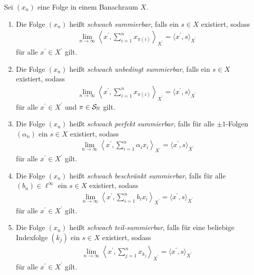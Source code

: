 \begin{df}
	Sei $ (x_n) $ eine Folge in einem Banachraum $ X $. 
	\begin{enumerate}
		\item 
		Die Folge $ (x_n) $ heißt  \textit{schwach summierbar}, falls ein $ s  \in X$ existiert, sodass
		\begin{align*}
			\lim\limits_{n \to \infty}
			\left\langle x^\prime,
			\sum \limits_{i = 1}^n x_{\pi(i)}
			\right\rangle_{X^\prime}
			= 
			\langle x^\prime,s\rangle_{X^\prime}
		\end{align*}
		für alle $ x^\prime \in X^\prime $ gilt.
		
		\item 
		Die Folge $ (x_n) $ heißt  \textit{schwach unbedingt summierbar}, falls ein $ s  \in X$ existiert, sodass
		\begin{align*}
			\lim\limits_{n \to \infty}
			\left\langle x^\prime,
			\sum \limits_{i = 1}^n x_{\pi(i)}
			\right\rangle_{X^\prime}
			= 
			\langle x^\prime,s \rangle_{X^\prime}
		\end{align*}
		für alle $ x^\prime \in X^\prime $ und $ \pi \in \mathcal{S}_{\mathbb{N}} $ gilt.
		
		\item 
		Die Folge $ (x_n) $ heißt  \textit{schwach perfekt summierbar}, falls für alle $ \pm 1 $-Folgen $ (\alpha_n) $ ein $ s  \in X$ existiert, sodass
		\begin{align*}
			\lim\limits_{n \to \infty}
			\left\langle x^\prime,
			\sum \limits_{i = 1}^n \alpha_i x_i
			\right\rangle_{X^\prime}
			= 
			\langle x^\prime,s\rangle_{X^\prime}
		\end{align*}
		für alle $ x^\prime \in X^\prime $ gilt.
%		
		\item 
		Die Folge $ (x_n) $ heißt  \textit{schwach beschränkt summierbar}, falls für alle $ (b_n)  \in \ell^\infty $ ein $ s  \in X$ existiert, sodass
		\begin{align*}
			\lim\limits_{n \to \infty}
			\left\langle x^\prime,
			\sum \limits_{i = 1}^n b_i x_i
		\right\rangle_{X^\prime}
		= 
		\langle x^\prime,s\rangle_{X^\prime}
		\end{align*}
		für alle $ x^\prime \in X^\prime $ gilt.
%		
		\item 
		Die Folge $ (x_n) $ heißt  \textit{schwach teil-summierbar}, falls für eine beliebige Indexfolge $ (k_j) $ ein $ s  \in X$ existiert, sodass
		\begin{align*}
			\lim\limits_{n \to \infty}
			\left\langle
			x^\prime,
			\sum \limits_{j = 1}^n x_{k_j}
			\right\rangle_{X^\prime}
			= 
		\langle x^\prime,s\rangle_{X^\prime}
		\end{align*}
		für alle $ x^\prime \in X^\prime $ gilt.
	\end{enumerate}
	
	

\end{df}

